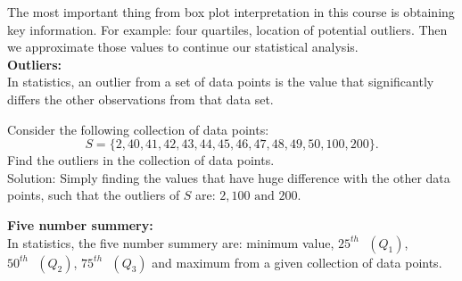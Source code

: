 The most important thing from box plot interpretation in this course is obtaining key information. For example: four quartiles, location of potential outliers. Then we approximate those values to continue our statistical analysis.\\

\noindent
\textbf{Outliers:}\\
In statistics, an outlier from a set of data points is the value that significantly differs the other observations from that data set.

\begin{example}
Consider the following collection of data points: \[ S = \{2, 40, 41, 42, 43, 44, 45, 46, 47, 48, 49, 50, 100, 200\}. \] Find the outliers in the collection of data points.\\

Solution: Simply finding the values that have huge difference with the other data points, such that the outliers of $S$ are: $2, 100 \text{ and } 200$.
\end{example}

\noindent
\textbf{Five number summery:}\\
In statistics, the five number summery are: minimum value, $25^{th} \text{ } (Q_{1})$, $50^{th} \text{ } (Q_{2})$, $75^{th} \text{ } (Q_{3})$ and maximum from a given collection of data points.







